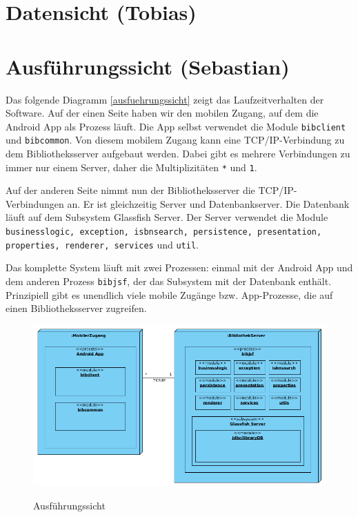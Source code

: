 \documentclass[fontsize=12pt,paper=a4,twoside]{scrartcl}
\begin{document}
\section{Datensicht (Tobias)}
\label{sec:datensicht}

\section{Ausführungssicht (Sebastian)}

Das folgende Diagramm \vref{ausfuehrungssicht} zeigt das Laufzeitverhalten der Software.
Auf der einen Seite haben wir den mobilen Zugang, auf dem die Android App als Prozess läuft. Die App selbst verwendet die Module \texttt{bibclient} und \texttt{bibcommon}. Von diesem mobilem Zugang kann eine TCP/IP-Verbindung zu dem Bibliotheksserver aufgebaut werden. Dabei gibt es mehrere Verbindungen zu immer nur einem Server, daher die Multiplizitäten \texttt{*} und \texttt{1}.

Auf der anderen Seite nimmt nun der Bibliotheksserver die TCP/IP-Verbindungen an. Er ist gleichzeitig Server und Datenbankserver. Die Datenbank läuft auf dem Subsystem Glassfish Server. Der Server verwendet die Module \texttt{businesslogic, exception, isbnsearch, persistence, presentation, properties, renderer, services} und \texttt{util}.

Das komplette System läuft mit zwei Prozessen: einmal mit der Android App und dem anderen Prozess \texttt{bibjsf}, der das Subsystem mit der Datenbank enthält. Prinzipiell gibt es unendlich viele mobile Zugänge bzw. App-Prozesse, die auf einen Bibliotheksserver zugreifen.

\begin{figure} [H] 
\caption{Ausführungssicht} 
	\includegraphics[width=1\textwidth]{Diagramme/ausfuehrungssicht.png} 
	\label{ausfuehrungssicht} 
\end{figure}
\label{sec:ausfuehrung}
\end{document}
